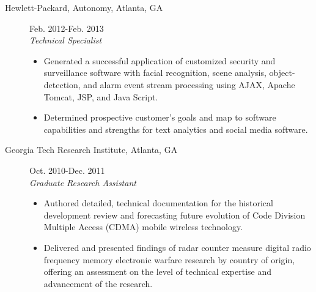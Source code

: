 \documentclass{res}
\begin{document}
\begin{resume}
\begin{description}
    		\item[{Hewlett-Packard, Autonomy}, Atlanta, GA]\hfill Feb. 2012-Feb. 2013\\\textit{Technical Specialist}
    		\vspace{-0.1in}
    		\begin{itemize}
    			\item Generated a successful application of customized security and surveillance software with facial recognition, scene analysis, object-detection, and alarm event stream processing using AJAX, Apache Tomcat, JSP, and Java Script.
    			\item Determined prospective customer's goals and map to software capabilities and strengths for text analytics and social media software. 
    		\end{itemize}
    	
    		\item[{Georgia Tech Research Institute}, Atlanta, GA]\hfill Oct. 2010-Dec. 2011\\\textit{Graduate Research Assistant}
    		\vspace{-0.1in}
    		\begin{itemize}
    			\item Authored detailed, technical documentation for the historical development review and forecasting future evolution of Code Division Multiple Access (CDMA) mobile wireless technology. 
    			\item Delivered and presented findings of radar counter measure digital radio frequency memory electronic warfare research by country of origin, offering an assessment on the level of technical expertise and advancement of the research.
    		\end{itemize}
    	\end{description}
  

\end{resume}
\end{document}
